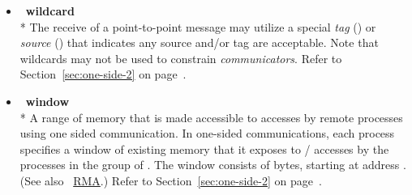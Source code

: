 \begin{itemize}
\label{glossary:wildcard}
\item  ~\hypertarget{glossary:wildcard}{\textbf{wildcard}} \\*
The receive of a point-to-point message may utilize
a special \emph{tag} () 
or \emph{source} () that
indicates any source and/or tag are acceptable.  Note that
wildcards may not be used to constrain \emph{communicators}.
Refer to Section~\ref{sec:one-side-2} on page~\pageref{sec:one-side-2}.

\label{glossary:window}
\item  ~\hypertarget{glossary:window}{\textbf{window}} \\*
A range of memory that is made accessible to accesses by remote 
processes using one sided communication. 
In one-sided communications, each process specifies
a window of existing memory that it exposes to \RMA/ accesses by the
processes in the group of  .
The window consists of  bytes,
starting at address .
(See also ~\hyperlink{glossary:RMA}{RMA}.)
Refer to Section~\ref{sec:one-side-2} on page~\pageref{sec:one-side-2}.


\end{itemize}